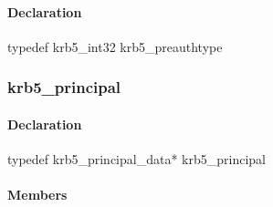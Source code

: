 \documentclass[letterpaper,10pt,english]{sphinxmanual}
\begin{document}
\begin{fulllineitems}
\label{appdev/refs/types/krb5_preauthtype:krb5_preauthtype}
\end{fulllineitems}



\paragraph{Declaration}
\label{appdev/refs/types/krb5_preauthtype:declaration}
typedef krb5\_int32 krb5\_preauthtype


\subsubsection{krb5\_principal}
\label{appdev/refs/types/krb5_principal:krb5-principal-struct}\label{appdev/refs/types/krb5_principal:krb5-principal}\label{appdev/refs/types/krb5_principal::doc}

\begin{fulllineitems}
\label{appdev/refs/types/krb5_principal:krb5_principal}
\end{fulllineitems}



\paragraph{Declaration}
\label{appdev/refs/types/krb5_principal:declaration}
typedef krb5\_principal\_data* krb5\_principal


\paragraph{Members}
\label{appdev/refs/types/krb5_principal:members}

\begin{fulllineitems}
\label{appdev/refs/types/krb5_principal:krb5_principal.magic}
\end{fulllineitems}


\begin{fulllineitems}
\label{appdev/refs/types/krb5_principal:krb5_principal.realm}
\end{fulllineitems}
\end{document}
